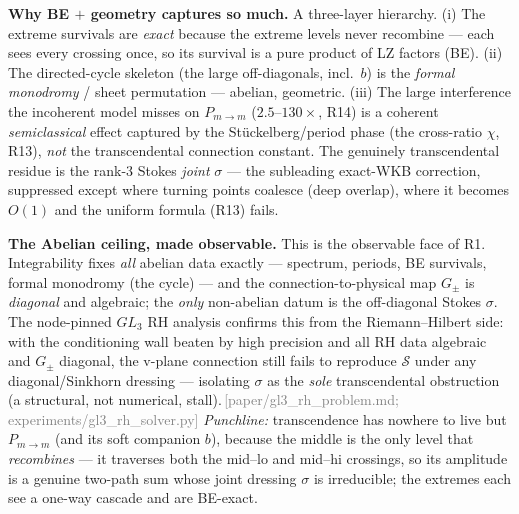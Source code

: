 \documentclass[aps,prd,reprint,nofootinbib]{revtex4-2}
\newcommand{\pnote}[1]{\textcolor{gray}{\footnotesize\,[#1]}}
\newcommand{\Scat}{\mathcal{S}}   %
\newcommand{\Pmid}{P_{m\to m}}   %
\begin{document}
\textbf{Why BE $+$ geometry captures so much.} A three-layer hierarchy. (i) The extreme survivals are
\emph{exact} because the extreme levels never recombine --- each sees every crossing once, so its
survival is a pure product of LZ factors (BE). (ii) The directed-cycle skeleton (the large off-diagonals,
incl.\ $b$) is the \emph{formal monodromy} / sheet permutation --- abelian, geometric. (iii) The large
interference the incoherent model misses on $\Pmid$ ($2.5$--$130\times$, R14) is a coherent
\emph{semiclassical} effect captured by the St\"uckelberg/period phase (the cross-ratio $\chi$, R13),
\emph{not} the transcendental connection constant. The genuinely transcendental residue is the rank-3
Stokes \emph{joint} $\sigma$ --- the subleading exact-WKB correction, suppressed except where turning
points coalesce (deep overlap), where it becomes $O(1)$ and the uniform formula (R13) fails.

\textbf{The Abelian ceiling, made observable.} This is the observable face of R1. Integrability fixes
\emph{all} abelian data exactly --- spectrum, periods, BE survivals, formal monodromy (the cycle) --- and
the connection-to-physical map $G_\pm$ is \emph{diagonal} and algebraic; the \emph{only} non-abelian datum
is the off-diagonal Stokes $\sigma$. The node-pinned $GL_3$ RH analysis confirms this from the
Riemann--Hilbert side: with the conditioning wall beaten by high precision and all RH data algebraic and
$G_\pm$ diagonal, the v-plane connection still fails to reproduce $\Scat$ under any diagonal/Sinkhorn
dressing --- isolating $\sigma$ as the \emph{sole} transcendental obstruction (a structural, not numerical,
stall).\pnote{paper/gl3\_rh\_problem.md; experiments/gl3\_rh\_solver.py} \emph{Punchline:} transcendence
has nowhere to live but $\Pmid$ (and its soft companion $b$), because the middle is the only level that
\emph{recombines} --- it traverses both the mid--lo and mid--hi crossings, so its amplitude is a genuine
two-path sum whose joint dressing $\sigma$ is irreducible; the extremes each see a one-way cascade and are
BE-exact.
\end{document}
